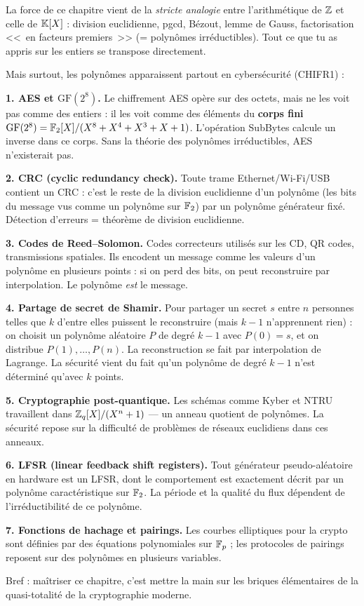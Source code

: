 \begin{intuitionbox}[Polynômes = c\oe ur de la crypto moderne]
La force de ce chapitre vient de la \emph{stricte analogie} entre l'arithmétique de $\mathbb{Z}$ et celle de $\mathbb{K}[X]$ : division euclidienne, pgcd, Bézout, lemme de Gauss, factorisation <<~en facteurs premiers~>> (= polynômes irréductibles). Tout ce que tu as appris sur les entiers se transpose directement.

Mais surtout, les polynômes apparaissent partout en cybersécurité (CHIFR1) :

\textbf{1. AES et $\mathrm{GF}(2^8)$.} Le chiffrement AES opère sur des octets, mais ne les voit pas comme des entiers : il les voit comme des éléments du \textbf{corps fini} $\mathrm{GF}(2^8) = \mathbb{F}_2[X]/(X^8 + X^4 + X^3 + X + 1)$. L'opération SubBytes calcule un inverse dans ce corps. Sans la théorie des polynômes irréductibles, AES n'existerait pas.

\textbf{2. CRC (cyclic redundancy check).} Toute trame Ethernet/Wi-Fi/USB contient un CRC : c'est le reste de la division euclidienne d'un polynôme (les bits du message vus comme un polynôme sur $\mathbb{F}_2$) par un polynôme générateur fixé. Détection d'erreurs = théorème de division euclidienne.

\textbf{3. Codes de Reed--Solomon.} Codes correcteurs utilisés sur les CD, QR codes, transmissions spatiales. Ils encodent un message comme les valeurs d'un polynôme en plusieurs points : si on perd des bits, on peut reconstruire par interpolation. Le polynôme \emph{est} le message.

\textbf{4. Partage de secret de Shamir.} Pour partager un secret $s$ entre $n$ personnes telles que $k$ d'entre elles puissent le reconstruire (mais $k-1$ n'apprennent rien) : on choisit un polynôme aléatoire $P$ de degré $k-1$ avec $P(0) = s$, et on distribue $P(1), \ldots, P(n)$. La reconstruction se fait par interpolation de Lagrange. La sécurité vient du fait qu'un polynôme de degré $k-1$ n'est déterminé qu'avec $k$ points.

\textbf{5. Cryptographie post-quantique.} Les schémas comme Kyber et NTRU travaillent dans $\mathbb{Z}_q[X]/(X^n + 1)$ --- un anneau quotient de polynômes. La sécurité repose sur la difficulté de problèmes de réseaux euclidiens dans ces anneaux.

\textbf{6. LFSR (linear feedback shift registers).} Tout générateur pseudo-aléatoire en hardware est un LFSR, dont le comportement est exactement décrit par un polynôme caractéristique sur $\mathbb{F}_2$. La période et la qualité du flux dépendent de l'irréductibilité de ce polynôme.

\textbf{7. Fonctions de hachage et pairings.} Les courbes elliptiques pour la crypto sont définies par des équations polynomiales sur $\mathbb{F}_p$ ; les protocoles de pairings reposent sur des polynômes en plusieurs variables.

Bref : maîtriser ce chapitre, c'est mettre la main sur les briques élémentaires de la quasi-totalité de la cryptographie moderne.
\end{intuitionbox}


